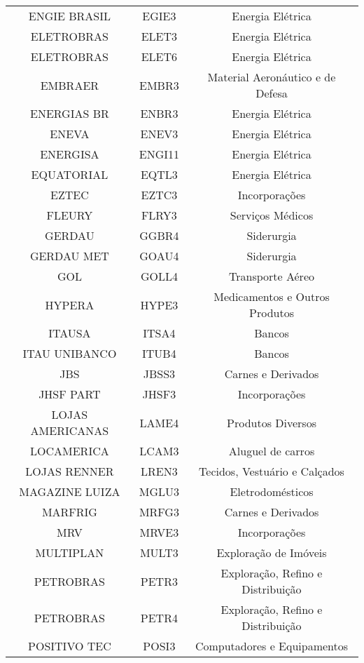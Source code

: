 \begin{center}
{\begin{longtable}[c]{ccc}
            ENGIE BRASIL & EGIE3 & Energia Elétrica \\
            ELETROBRAS & ELET3 & Energia Elétrica \\
            ELETROBRAS & ELET6 & Energia Elétrica \\
            EMBRAER & EMBR3 & Material Aeronáutico e de Defesa \\
            ENERGIAS BR & ENBR3 & Energia Elétrica \\
            ENEVA & ENEV3 & Energia Elétrica \\
            ENERGISA & ENGI11 & Energia Elétrica \\
            EQUATORIAL & EQTL3 & Energia Elétrica \\
            EZTEC & EZTC3 & Incorporações \\
            FLEURY & FLRY3 & Serviços Médicos \\
            GERDAU & GGBR4 & Siderurgia \\
            GERDAU MET & GOAU4 & Siderurgia \\
            GOL & GOLL4 & Transporte Aéreo \\
            HYPERA & HYPE3 & Medicamentos e Outros Produtos \\
            ITAUSA & ITSA4 & Bancos \\
            ITAU UNIBANCO & ITUB4 & Bancos \\
            JBS & JBSS3 & Carnes e Derivados \\
            JHSF PART & JHSF3 & Incorporações \\
            LOJAS AMERICANAS & LAME4 & Produtos Diversos \\
            LOCAMERICA & LCAM3 & Aluguel de carros \\
            LOJAS RENNER & LREN3 & Tecidos, Vestuário e Calçados \\
            MAGAZINE LUIZA & MGLU3 & Eletrodomésticos \\
            MARFRIG & MRFG3 & Carnes e Derivados \\
            MRV & MRVE3 & Incorporações \\
            MULTIPLAN & MULT3 & Exploração de Imóveis \\
            PETROBRAS & PETR3 & Exploração, Refino e Distribuição \\
            PETROBRAS & PETR4 & Exploração, Refino e Distribuição \\
            POSITIVO TEC & POSI3 & Computadores e Equipamentos \\

\end{longtable}}
\end{center}
